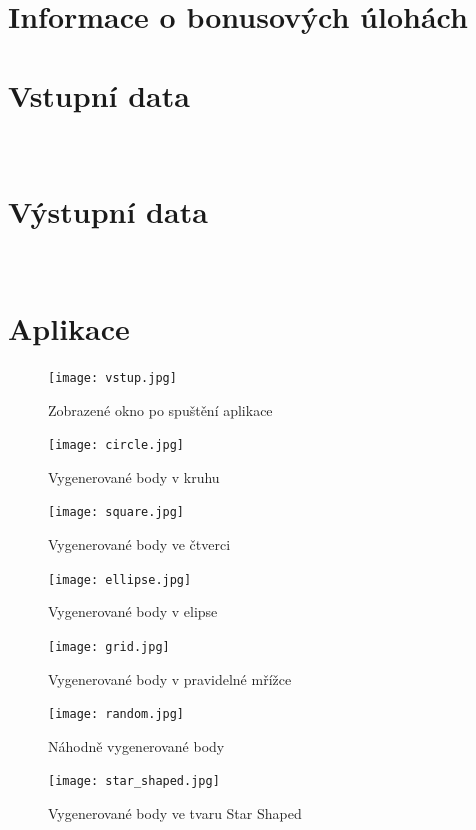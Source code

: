 \documentclass[a4paper, 12pt]{article}
\begin{document}
\section{Informace o bonusových úlohách}


\section{Vstupní data}
\\

\section{Výstupní data}
\\


\clearpage
\section{Aplikace}
\begin{figure}[h!]
	\centering
	\texttt{[image: vstup.jpg]}
	\caption{Zobrazené okno po spuštění aplikace}
\end{figure}

\begin{figure}[h!]
	\centering
	\texttt{[image: circle.jpg]}
	\caption{Vygenerované body v kruhu}
\end{figure}

\begin{figure}[h!]
	\centering
	\texttt{[image: square.jpg]}
	\caption{Vygenerované body ve čtverci}
\end{figure}

\begin{figure}[h!]
	\centering
	\texttt{[image: ellipse.jpg]}
	\caption{Vygenerované body v elipse}
\end{figure}

\begin{figure}[h!]
	\centering
	\texttt{[image: grid.jpg]}
	\caption{Vygenerované body v pravidelné mřížce}
\end{figure}

\begin{figure}[h!]
	\centering
	\texttt{[image: random.jpg]}
	\caption{Náhodně vygenerované body}
\end{figure}

\begin{figure}[h!]
	\centering
	\texttt{[image: star\_shaped.jpg]}
	\caption{Vygenerované body ve tvaru Star Shaped}
\end{figure}
\end{document}
